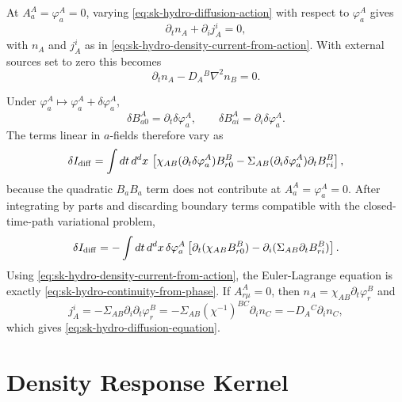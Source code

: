 \begin{remark}
\label{rem:sk-hydro-diffusion-equation}
At \(A^A_a=\varphi^A_a=0\), varying
\eqref{eq:sk-hydro-diffusion-action} with respect to \(\varphi^A_a\) gives
\begin{equation}
  \partial_t n_A+\partial_i j_A^i=0,
  \label{eq:sk-hydro-continuity-from-phase}
\end{equation}
with \(n_A\) and \(j_A^i\) as in
\eqref{eq:sk-hydro-density-current-from-action}.  With external sources set
to zero this becomes
\begin{equation}
  \partial_t n_A-D_A{}^B\nabla^2 n_B=0 .
  \label{eq:sk-hydro-diffusion-equation}
\end{equation}

Under \(\varphi^A_a\mapsto\varphi^A_a+\delta\varphi^A_a\),
\[
  \delta B^A_{a0}=\partial_t\delta\varphi^A_a,
  \qquad
  \delta B^A_{ai}=\partial_i\delta\varphi^A_a .
\]
The terms linear in \(a\)-fields therefore vary as
\[
  \delta I_{\rm diff}
  =
  \int dt\,d^dx\,
  \left[
  \chi_{AB}(\partial_t\delta\varphi^A_a)B^B_{r0}
  -\Sigma_{AB}(\partial_i\delta\varphi^A_a)\partial_tB^B_{ri}
  \right],
\]
because the quadratic \(B_aB_a\) term does not contribute at
\(A^A_a=\varphi^A_a=0\).  After integrating by parts and discarding boundary
terms compatible with the closed-time-path variational problem,
\[
  \delta I_{\rm diff}
  =
  -\int dt\,d^dx\,\delta\varphi^A_a
  \left[
  \partial_t(\chi_{AB}B^B_{r0})
  -\partial_i(\Sigma_{AB}\partial_tB^B_{ri})
  \right].
\]
Using \eqref{eq:sk-hydro-density-current-from-action}, the Euler-Lagrange
equation is exactly \eqref{eq:sk-hydro-continuity-from-phase}.  If
\(A^A_{r\mu}=0\), then \(n_A=\chi_{AB}\partial_t\varphi^B_r\) and
\[
  j_A^i=-\Sigma_{AB}\partial_i\partial_t\varphi^B_r
  =-\Sigma_{AB}(\chi^{-1})^{BC}\partial_i n_C
  =-D_A{}^C\partial_i n_C,
\]
which gives \eqref{eq:sk-hydro-diffusion-equation}.
\end{remark}

\section{Density Response Kernel}

